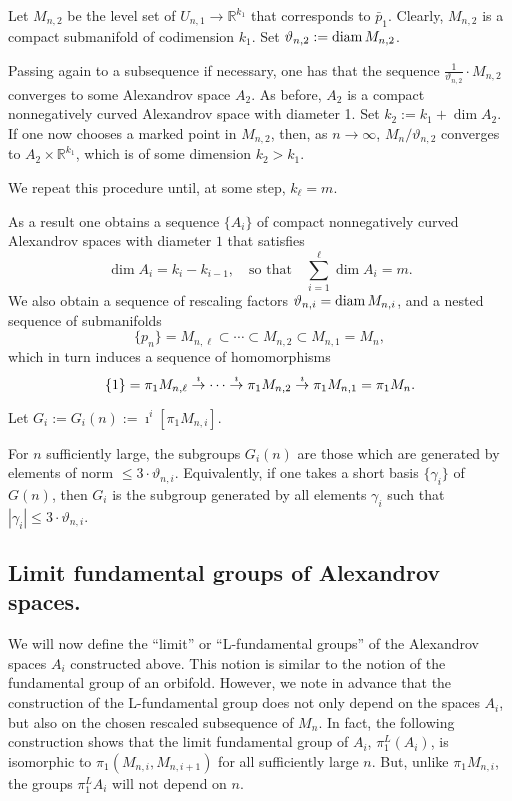 \documentclass{amsart}
\begin{document}
Let  $M_{n,2}$  be the level set of $U_{n,1}\to \mathbb{R}^{k_1}$
that corresponds to $\bar p_1$.
Clearly, $M_{n,2}$ is a compact submanifold of codimension $k_1$.
Set $\vartheta_{n,2}:=\operatorname{\rm diam} M_{n,2}$.

Passing again to a subsequence if necessary, one has
that the sequence $\frac{1}{\vartheta_{n,2}}{\cdot} M_{n,2}$
converges to some  Alexandrov space $A_2$.
As before, $A_2$ is a compact nonnegatively curved Alexandrov space
with diameter 1. Set $k_2:=k_1+\dim A_2$.
If one now chooses a marked point in $M_{n,2}$,
then, as $n\to\infty$,
$M_n/\vartheta_{n,2}$ converges to $A_2\times\mathbb{R}^{k_1}$,
which is of some dimension $k_2>k_1$.

We repeat this procedure until, at some step, $k_\ell=m$.

\medskip

As a result one obtains
a sequence $\{A_i\}$ of compact nonnegatively curved Alexandrov spaces
with diameter $1$ that satisfies
$$\dim A_i=k_i-k_{i-1}, 
\quad\text{so that}\quad
\sum_{i=1}^\ell\dim A_i=m.$$
We also obtain
a sequence of rescaling factors $\vartheta_{n,i}=\operatorname{\rm diam} M_{n,i}$,
and  a nested sequence of submanifolds
$$\{p_n\}=M_{n,\ell}\subset \cdots \subset M_{n,2}\subset M_{n,1}=M_n,$$
which in turn induces a sequence of homomorphisms
$$\{1\}=\pi_1M_{n,\ell}\buildrel {\imath}
\over \rightarrow \cdots\buildrel {\imath}
\over \rightarrow \pi_1M_{n,2}\buildrel {\imath}
\over \rightarrow \pi_1M_{n,1}=\pi_1M_n.$$


Let $G_i:=G_i(n):=\imath^i[\pi_1M_{n,i}]$.

For $n$ sufficiently large,
the subgroups $G_i(n)$ are those which are
generated by elements of  norm $\le 3{\cdot} \vartheta_{n,i}$.
Equivalently, if one takes a short basis $\{\gamma_i\}$ of $G(n)$,
then $G_i$ is the subgroup generated by all elements $\gamma_i$
such that $|\gamma_i|\le 3{\cdot} \vartheta_{n,i}$.




\subsection{ Limit fundamental groups of  Alexandrov spaces.}\label{fun-gr}

We will now define the ``limit'' or ``L-fundamental groups'' of
the Alexandrov spaces $A_i$ constructed above.
This notion is similar to the notion of  the fundamental group of an orbifold.
However, we note in advance
that the construction of the L-fundamental group does not only
depend on the spaces $A_i$,
but also on the chosen rescaled subsequence of $M_n$.
In fact, the following construction shows
that the limit fundamental group of $A_i$,
$\pi^L_1(A_i)$,
is isomorphic to $\pi_1(M_{n,i},M_{n,i+1})$
for all sufficiently large $n$.
But, unlike $\pi_1M_{n,i}$, the groups $\pi_1^LA_i$ will not depend on $n$.
\end{document}
